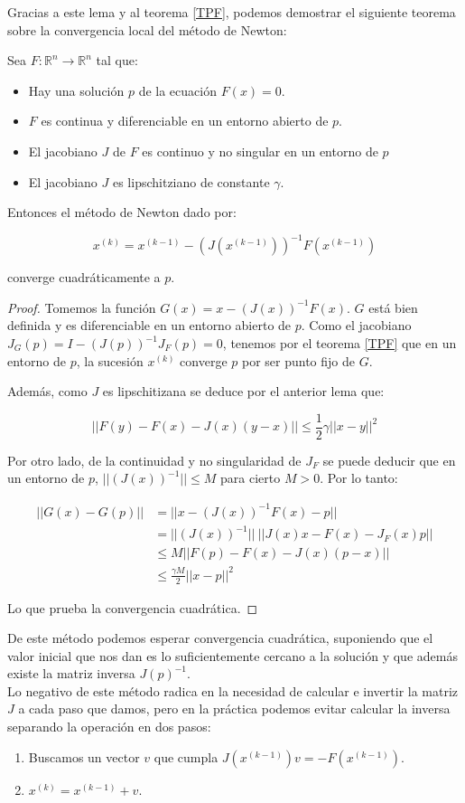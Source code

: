 Gracias a este lema y al teorema \ref{TPF}, podemos demostrar el siguiente teorema sobre la convergencia local del método de Newton:

\begin{theorem}
Sea $F : \mathbb{R}^n \to \mathbb{R}^n$ tal que:

\begin{itemize}
	\item Hay una solución $p$ de la ecuación $F(x)=0$.
	\item $F$ es continua y diferenciable en un entorno abierto de $p$.
	\item El jacobiano $J$ de $F$ es continuo y no singular en un entorno de $p$
	\item El jacobiano $J$ es lipschitziano de constante $\gamma$.
\end{itemize}

Entonces el método de Newton dado por:

\[ x^{(k)} = x^{(k-1)} - (J(x^{(k-1)}))^{-1}F(x^{(k-1)}) \]

converge cuadráticamente a $p$.
\end{theorem}
\begin{proof}
Tomemos la función $G(x) = x - (J(x))^{-1}F(x)$. $G$ está bien definida y es diferenciable en un entorno abierto de $p$.
Como el jacobiano $J_G(p) = I - (J(p))^{-1}J_F(p) = 0$, tenemos por el teorema \ref{TPF} que en un entorno de $p$, la sucesión $x^{(k)}$ converge $p$ por ser punto fijo de $G$.

Además, como $J$ es lipschitizana se deduce por el anterior lema que:

$$ || F(y)-F(x)-J(x)(y-x) || \leq \frac{1}{2} \gamma ||x-y||^2 $$

Por otro lado, de la continuidad y no singularidad de $J_F$ se puede deducir que en un entorno de $p$, $||(J(x))^{-1}|| \leq M$ para cierto $M > 0$. Por lo tanto:

\begin{align*}||G(x)-G(p)|| & = || x-(J(x))^{-1}F(x)-p||\\
& = ||(J(x))^{-1}||\ || J(x)x-F(x)-J_F(x)p||\\
& \leq M || F(p) - F(x) - J(x)(p-x)||\\
& \leq \frac{\gamma M}{2} ||x-p||^2
\end{align*}

Lo que prueba la convergencia cuadrática.
\end{proof}

De este método podemos esperar convergencia cuadrática, suponiendo que el valor inicial que nos dan es lo suficientemente cercano a la solución y que además existe la matriz inversa $J(p)^{-1}$. \\
Lo negativo de este método radica en la necesidad de calcular e invertir la matriz $J$ a cada paso que damos, pero en la práctica podemos evitar calcular la inversa separando la operación en dos pasos:
\begin{enumerate}
	\item Buscamos un vector $v$ que cumpla $J(x^{(k-1)})v = -F(x^{(k-1)})$.
	\item $x^{(k)} = x^{(k-1)} + v$.
\end{enumerate}
